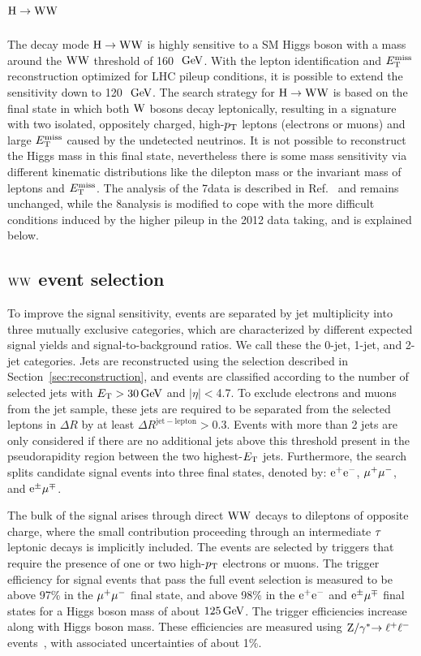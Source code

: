 \documentclass[12pt,twoside,a4paper,cmspaper,final,collab]{cms-tdr}
\begin{document}
\section{\texorpdfstring{$\mathrm{H}\to\mathrm{W}\mathrm{W}$}{H to WW}\label{sec:hww2l2nu}}
The decay mode $\mathrm{H}\to\mathrm{W}\mathrm{W}$ is highly sensitive to
a SM Higgs boson with a mass around the $\mathrm{W}\mathrm{W}$ threshold of
160~$\,\text{Ge\hspace{-.08em}V}$. With the lepton identification and
$E_{\mathrm{T}}^{\text{miss}}$ reconstruction optimized for LHC pileup conditions, it is possible
to extend the sensitivity down to 120~$\,\text{Ge\hspace{-.08em}V}$. The search strategy for $\mathrm{H}\to\mathrm{W}\mathrm{W}$
is based on the final state in which both $\mathrm{W}$ bosons decay leptonically,
resulting in a signature with two isolated, oppositely charged, high-$p_{\mathrm{T}}$
leptons (electrons or muons) and large $E_{\mathrm{T}}^{\text{miss}}$ caused by the undetected neutrinos.
It is not possible to reconstruct the Higgs mass in this final state, nevertheless
there is some mass sensitivity via different kinematic distributions like the
dilepton mass or the invariant mass of leptons and $E_{\mathrm{T}}^{\text{miss}}$.
The analysis of the 7\TeV data is described in Ref.~\cite{Chatrchyan:2012ty}
and remains unchanged, while the 8\TeV analysis is modified to cope with
the more difficult conditions induced by the higher pileup in the 2012 data
taking, and is explained below.


\subsection{\texorpdfstring{$\mathrm{W}\mathrm{W}$}{WW} event selection}
\label{sec:ww_evtsel}
To improve the signal sensitivity, events are separated by jet
multiplicity into three mutually exclusive categories, which are characterized
by different expected signal yields and signal-to-background ratios.
We call these the 0-jet, 1-jet, and 2-jet categories.
Jets are reconstructed using the selection described in
Section~\ref{sec:reconstruction}, and events are classified according to the
number of selected jets with $E_{\mathrm{T}}>30\,\text{Ge\hspace{-.08em}V}$ and $|\eta|<$4.7.
To exclude electrons and muons from the jet sample, these
jets are required to be separated from the selected leptons in $\Delta R$
by at least $\Delta R^{\mathrm{jet-lepton}}>0.3$.
Events with more than 2 jets are only considered if there are no
additional jets above this threshold present in the pseudorapidity
region between the two highest-$E_{\mathrm{T}}$ jets.
Furthermore, the search splits candidate signal events into
three final states, denoted by: $\mathrm{e}^+\mathrm{e}^-$, ${\mu^+}{\mu^-}$, and $\mathrm{e}^{\pm}{\mu}^{\mp}$.

The bulk of the signal arises through direct $\mathrm{W}\mathrm{W}$ decays to dileptons
of opposite charge, where the small contribution
proceeding through an intermediate $\tau$ leptonic decays is implicitly included.
The events are selected by triggers that  require
the presence of one or two high-$p_{\mathrm{T}}$ electrons or muons.
The trigger efficiency for signal events that pass the full event selection
is measured to be above 97\% in the ${\mu^+}{\mu^-}$ final state, and above 98\% in the
$\mathrm{e}^+\mathrm{e}^-$ and $\mathrm{e}^{\pm}{\mu}^{\mp}$ final states for a Higgs boson mass of about $125\,\text{Ge\hspace{-.08em}V}$.
The trigger efficiencies increase along with Higgs boson mass. These
efficiencies are measured using $\mathrm{Z}/\gamma^*{\to \ell^+\ell^-}$ events~\cite{CMS:2011aa}, with associated
uncertainties of about 1\%.
\end{document}
